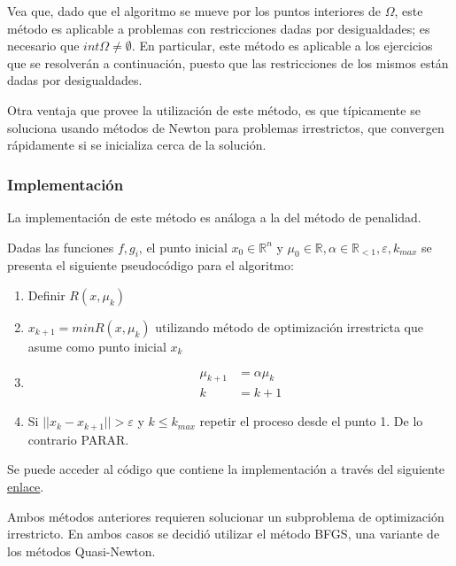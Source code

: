 \documentclass[titlepage, 11pt]{scrartcl}
\begin{document}
	Vea que, dado que el algoritmo se mueve por los puntos interiores de $\Omega$, este método es aplicable a problemas con restricciones dadas por desigualdades; es necesario que $int \Omega \neq \emptyset$. En particular, este método es aplicable a los ejercicios que se resolverán a continuación, puesto que las restricciones de los mismos están dadas por desigualdades.
	
	Otra ventaja que provee la utilización de este método, es que típicamente se soluciona usando métodos de Newton para problemas irrestrictos, que convergen rápidamente si se inicializa cerca de la solución.
	
		\subsubsection{Implementación}
		La implementación de este método es análoga a la del método de penalidad.
		
	Dadas las funciones $f, g_i$, el punto inicial $x_0 \in \mathbb{R}^n$ y $\mu_0 \in \mathbb{R}, \alpha \in \mathbb{R}_{< 1}, \varepsilon, k_{max}$ se presenta el siguiente pseudocódigo para el algoritmo:
	\begin{enumerate}
		\item Definir $R(x, \mu_k)$
		\item $x_{k + 1} = min R(x, \mu_k)$ utilizando método de optimización irrestricta que asume como punto inicial $x_k$
		\item \begin{align*}
		\mu_{k + 1} &= \alpha \mu_k\\
		k &= k + 1
		\end{align*}
		\item Si $||x_k - x_{k+ 1}|| > \varepsilon$ y $k \leq k_{max}$ repetir el proceso desde el punto 1. De lo contrario PARAR.
	\end{enumerate}
	Se puede acceder al código que contiene la implementación a través del siguiente \href{methods.py}{enlace}.
	
	Ambos métodos anteriores requieren solucionar un subproblema de optimización irrestricto. En ambos casos se decidió utilizar el método BFGS, una variante de los métodos Quasi-Newton.
	
\end{document}
